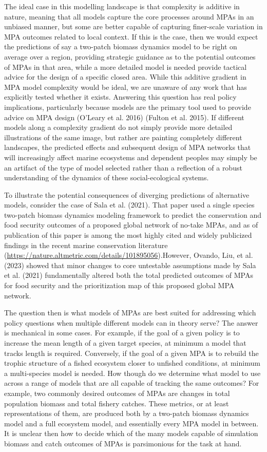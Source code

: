 \documentclass[
  default,
  lineno,
  referee]{sn-jnl}
\begin{document}
The ideal case in this modelling landscape is that complexity is
additive in nature, meaning that all models capture the core processes
around MPAs in an unbiased manner, but some are better capable of
capturing finer-scale variation in MPA outcomes related to local
context. If this is the case, then we would expect the predictions of
say a two-patch biomass dynamics model to be right on average over a
region, providing strategic guidance as to the potential outcomes of
MPAs in that area, while a more detailed model is needed provide
tactical advice for the design of a specific closed area. While this
additive gradient in MPA model complexity would be ideal, we are unaware
of any work that has explicitly tested whether it exists. Answering this
question has real policy implications, particularly because models are
the primary tool used to provide advice on MPA design (O'Leary et al.
2016) (Fulton et al. 2015). If different models along a complexity
gradient do not simply provide more detailed illustrations of the same
image, but rather are painting completely different landscapes, the
predicted effects and subsequent design of MPA networks that will
increasingly affect marine ecosystems and dependent peoples may simply
be an artifact of the type of model selected rather than a reflection of
a robust understanding of the dynamics of these social-ecological
systems.

To illustrate the potential consequences of diverging predictions of
alternative models, consider the case of Sala et al. (2021). That paper
used a single species two-patch biomass dynamics modeling framework to
predict the conservation and food security outcomes of a proposed global
network of no-take MPAs, and as of publication of this paper is among
the most highly cited and widely publicized findings in the recent
marine conservation literature
(\url{https://nature.altmetric.com/details/101895056}).However, Ovando,
Liu, et al. (2023) showed that minor changes to core untestable
assumptions made by Sala et al. (2021) fundamentally altered both the
total predicted outcomes of MPAs for food security and the
prioritization map of this proposed global MPA network.

The question then is what models of MPAs are best suited for addressing
which policy questions when multiple different models can in theory
serve? The answer is mechanical in some cases. For example, if the goal
of a given policy is to increase the mean length of a given target
species, at minimum a model that tracks length is required. Conversely,
if the goal of a given MPA is to rebuild the trophic structure of a
fished ecosystem closer to unfished conditions, at minimum a
multi-species model is needed. How though do we determine what model to
use across a range of models that are all capable of tracking the same
outcomes? For example, two commonly desired outcomes of MPAs are changes
in total population biomass and total fishery catches. These metrics, or
at least representations of them, are produced both by a two-patch
biomass dynamics model and a full ecosystem model, and essentially every
MPA model in between. It is unclear then how to decide which of the many
models capable of simulation biomass and catch outcomes of MPAs is
parsimonious for the task at hand.
\end{document}
